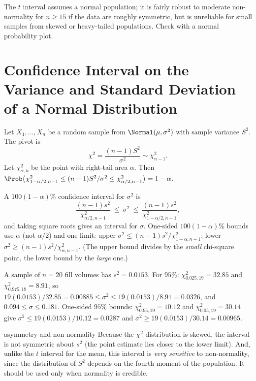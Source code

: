 The $t$ interval assumes a normal population; it is fairly robust to moderate non-normality for $n\ge15$ if the data are roughly symmetric, but is unreliable for small samples from skewed or heavy-tailed populations. Check with a normal probability plot.

\section{Confidence Interval on the Variance and Standard Deviation of a Normal Distribution}

Let $X_1,\dots,X_n$ be a random sample from $\Normal(\mu,\sigma^2)$ with sample variance $S^2$. The pivot is
\[ \chi^2=\frac{(n-1)S^2}{\sigma^2}\sim\chi^2_{n-1}. \]
Let $\chi^2_{\alpha,k}$ be the point with right-tail area $\alpha$. Then $\Prob\big(\chi^2_{1-\alpha/2,n-1}\le(n-1)S^2/\sigma^2\le\chi^2_{\alpha/2,n-1}\big)=1-\alpha$.

\begin{theorem}\label{thm:var-ci}
A $100(1-\alpha)\%$ confidence interval for $\sigma^2$ is
\[ \frac{(n-1)s^2}{\chi^2_{\alpha/2,n-1}}\ \le\ \sigma^2\ \le\ \frac{(n-1)s^2}{\chi^2_{1-\alpha/2,n-1}}, \]
and taking square roots gives an interval for $\sigma$. One-sided $100(1-\alpha)\%$ bounds use $\alpha$ (not $\alpha/2$) and one limit: upper $\sigma^2\le(n-1)s^2/\chi^2_{1-\alpha,n-1}$; lower $\sigma^2\ge(n-1)s^2/\chi^2_{\alpha,n-1}$. (The upper bound divides by the \emph{small} chi-square point, the lower bound by the \emph{large} one.)
\end{theorem}

\begin{example}
A sample of $n=20$ fill volumes has $s^2=0.0153$. For $95\%$: $\chi^2_{0.025,19}=32.85$ and $\chi^2_{0.975,19}=8.91$, so $19(0.0153)/32.85=0.00885\le\sigma^2\le19(0.0153)/8.91=0.0326$, and $0.094\le\sigma\le0.181$. One-sided $95\%$ bounds: $\chi^2_{0.95,19}=10.12$ and $\chi^2_{0.05,19}=30.14$ give $\sigma^2\le19(0.0153)/10.12=0.0287$ and $\sigma^2\ge19(0.0153)/30.14=0.00965$.
\end{example}

\begin{nuance}{asymmetry and non-normality}
Because the $\chi^2$ distribution is skewed, the interval is not symmetric about $s^2$ (the point estimate lies closer to the lower limit). And, unlike the $t$ interval for the mean, this interval is \emph{very sensitive} to non-normality, since the distribution of $S^2$ depends on the fourth moment of the population. It should be used only when normality is credible.
\end{nuance}

